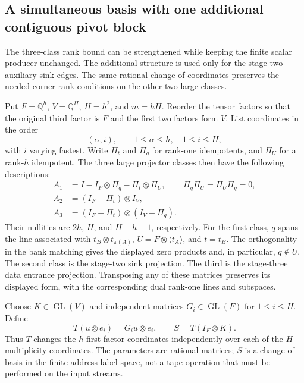 \subsection{A simultaneous basis with one additional contiguous pivot block}
\label{sec:controlled-projector-basis}

The three-class rank bound can be strengthened while keeping the finite
scalar producer unchanged. The additional structure is used only for the
stage-two auxiliary sink edges. The same rational change of coordinates
preserves the needed corner-rank conditions on the other two large classes.

Put $F=\mathbb Q^h$, $V=\mathbb Q^H$, $H=h^2$, and $m=hH$.
Reorder the tensor factors so that the original third factor is $F$ and the
first two factors form $V$. List coordinates in the order
\[
 (\alpha,i),\qquad 1\le\alpha\le h,\quad 1\le i\le H,
\]
with $i$ varying fastest. Write $\Pi_t$ and $\Pi_q$ for rank-one
idempotents, and $\Pi_U$ for a rank-$h$ idempotent. The three large
projector classes then have the following descriptions:
\begin{align*}
 A_1&=I-I_F\otimes\Pi_q-\Pi_t\otimes\Pi_U,
       &\Pi_q\Pi_U=\Pi_U\Pi_q=0,\\
 A_2&=(I_F-\Pi_t)\otimes I_V,\\
 A_3&=(I_F-\Pi_t)\otimes(I_V-\Pi_q).
\end{align*}
Their nullities are $2h$, $H$, and $H+h-1$, respectively.
For the first class, $q$ spans the line associated with
$t_B\otimes t_{\pi(A)}$, $U=F\otimes\langle t_A\rangle$, and
$t=t_B$. The orthogonality in the bank matching gives the displayed
zero products and, in particular, $q\notin U$.
The second class is the stage-two sink projection. The third is the
stage-three data entrance projection. Transposing any of these matrices
preserves its displayed form, with the corresponding dual rank-one lines
and subspaces.

Choose $K\in\operatorname{GL}(V)$ and independent matrices
$G_i\in\operatorname{GL}(F)$ for $1\le i\le H$. Define
\[
 T(u\otimes e_i)=G_i u\otimes e_i,\qquad S=T(I_F\otimes K).
\]
Thus $T$ changes the $h$ first-factor coordinates independently over each
of the $H$ multiplicity coordinates. The parameters are rational matrices;
$S$ is a change of basis in the finite address-label space, not a tape
operation that must be performed on the input streams.

